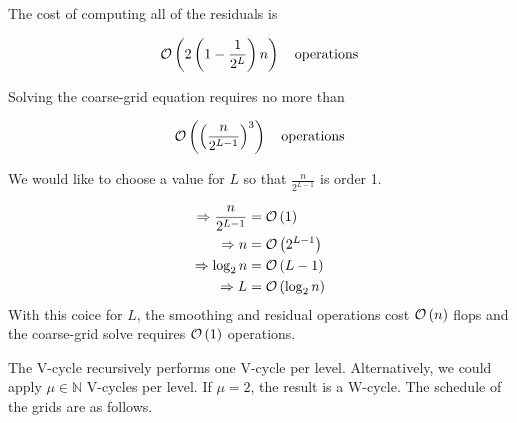 The cost of computing all of the residuals is

\begin{align*}
\mathcal{O}\left(2 \left( 1-\frac{1}{2^L} \right)n \right) \quad \text{operations}
\end{align*}

Solving the coarse-grid equation requires no more than 

\begin{equation*}
\mathcal{O}\left( \left( \frac{n}{2^{L-1}}\right)^3 \right)\quad \text{operations}
\end{equation*}

We would like to choose a value for $L$ so that $\frac{n}{2^{L-1}}$ is order 1.

\begin{align*}
\Rightarrow \frac{n}{2^{L-1}} &= \mathcal{O}\left(1\right)\\
  \Rightarrow n &= \mathcal{O}\left(2^{L-1}\right) \\
  \Rightarrow \log_2 n &=\mathcal{O}\left(L-1\right)\\
  \Rightarrow L &= \mathcal{O}\left(\log_2n\right)
\end{align*}
With this coice for $L$, the smoothing and residual operations cost $\mathcal{O}\left(n\right)$
flops and the 
coarse-grid solve requires $\mathcal{O}\left(1\right)$ operations.

The V-cycle recursively performs one V-cycle per level. Alternatively, we could
apply $\mu \in \mathbb{N}$ V-cycles per level. If $\mu=2$, the result is a
W-cycle. The schedule of the grids are as follows. 

\begin{center}

\end{center}

